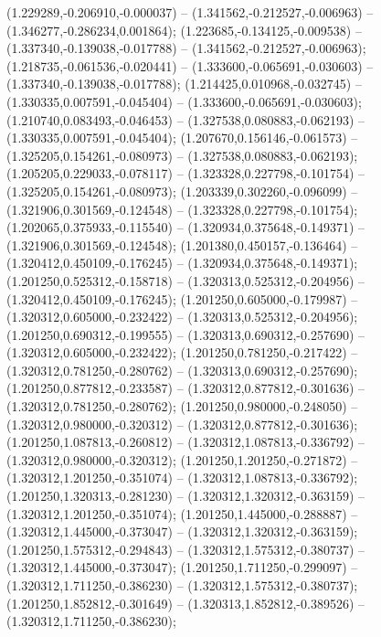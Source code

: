  (1.229289,-0.206910,-0.000037) -- (1.341562,-0.212527,-0.006963) -- (1.346277,-0.286234,0.001864);
 (1.223685,-0.134125,-0.009538) -- (1.337340,-0.139038,-0.017788) -- (1.341562,-0.212527,-0.006963);
 (1.218735,-0.061536,-0.020441) -- (1.333600,-0.065691,-0.030603) -- (1.337340,-0.139038,-0.017788);
 (1.214425,0.010968,-0.032745) -- (1.330335,0.007591,-0.045404) -- (1.333600,-0.065691,-0.030603);
 (1.210740,0.083493,-0.046453) -- (1.327538,0.080883,-0.062193) -- (1.330335,0.007591,-0.045404);
 (1.207670,0.156146,-0.061573) -- (1.325205,0.154261,-0.080973) -- (1.327538,0.080883,-0.062193);
 (1.205205,0.229033,-0.078117) -- (1.323328,0.227798,-0.101754) -- (1.325205,0.154261,-0.080973);
 (1.203339,0.302260,-0.096099) -- (1.321906,0.301569,-0.124548) -- (1.323328,0.227798,-0.101754);
 (1.202065,0.375933,-0.115540) -- (1.320934,0.375648,-0.149371) -- (1.321906,0.301569,-0.124548);
 (1.201380,0.450157,-0.136464) -- (1.320412,0.450109,-0.176245) -- (1.320934,0.375648,-0.149371);
 (1.201250,0.525312,-0.158718) -- (1.320313,0.525312,-0.204956) -- (1.320412,0.450109,-0.176245);
 (1.201250,0.605000,-0.179987) -- (1.320312,0.605000,-0.232422) -- (1.320313,0.525312,-0.204956);
 (1.201250,0.690312,-0.199555) -- (1.320313,0.690312,-0.257690) -- (1.320312,0.605000,-0.232422);
 (1.201250,0.781250,-0.217422) -- (1.320312,0.781250,-0.280762) -- (1.320313,0.690312,-0.257690);
 (1.201250,0.877812,-0.233587) -- (1.320312,0.877812,-0.301636) -- (1.320312,0.781250,-0.280762);
 (1.201250,0.980000,-0.248050) -- (1.320312,0.980000,-0.320312) -- (1.320312,0.877812,-0.301636);
 (1.201250,1.087813,-0.260812) -- (1.320312,1.087813,-0.336792) -- (1.320312,0.980000,-0.320312);
 (1.201250,1.201250,-0.271872) -- (1.320312,1.201250,-0.351074) -- (1.320312,1.087813,-0.336792);
 (1.201250,1.320313,-0.281230) -- (1.320312,1.320312,-0.363159) -- (1.320312,1.201250,-0.351074);
 (1.201250,1.445000,-0.288887) -- (1.320312,1.445000,-0.373047) -- (1.320312,1.320312,-0.363159);
 (1.201250,1.575312,-0.294843) -- (1.320312,1.575312,-0.380737) -- (1.320312,1.445000,-0.373047);
 (1.201250,1.711250,-0.299097) -- (1.320312,1.711250,-0.386230) -- (1.320312,1.575312,-0.380737);
 (1.201250,1.852812,-0.301649) -- (1.320313,1.852812,-0.389526) -- (1.320312,1.711250,-0.386230);
